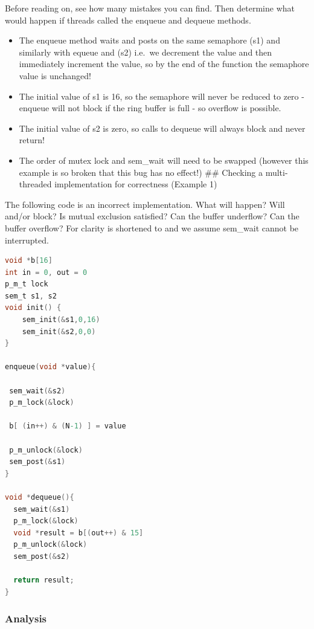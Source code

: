 Before reading on, see how many mistakes you can find. Then determine what would happen if threads called the enqueue and dequeue methods.

\begin{itemize}
\tightlist
\item
  The enqueue method waits and posts on the same semaphore (s1) and similarly with equeue and (s2) i.e.~we decrement the value and then immediately increment the value, so by the end of the function the semaphore value is unchanged!
\item
  The initial value of s1 is 16, so the semaphore will never be reduced to zero - enqueue will not block if the ring buffer is full - so overflow is possible.
\item
  The initial value of s2 is zero, so calls to dequeue will always block and never return!
\item
  The order of mutex lock and sem\_wait will need to be swapped (however this example is so broken that this bug has no effect!) \#\# Checking a multi-threaded implementation for correctness (Example 1)
\end{itemize}

The following code is an incorrect implementation. What will happen? Will  and/or  block? Is mutual exclusion satisfied? Can the buffer underflow? Can the buffer overflow? For clarity  is shortened to  and we assume sem\_wait cannot be interrupted.

\begin{lstlisting}[language=C]
void *b[16]
int in = 0, out = 0
p_m_t lock
sem_t s1, s2
void init() {
    sem_init(&s1,0,16)
    sem_init(&s2,0,0)
}

enqueue(void *value){

 sem_wait(&s2)
 p_m_lock(&lock)

 b[ (in++) & (N-1) ] = value

 p_m_unlock(&lock)
 sem_post(&s1)
}

void *dequeue(){
  sem_wait(&s1)
  p_m_lock(&lock)
  void *result = b[(out++) & 15]
  p_m_unlock(&lock)
  sem_post(&s2)

  return result;
}
\end{lstlisting}

\subsubsection{Analysis}\label{analysis-1}

